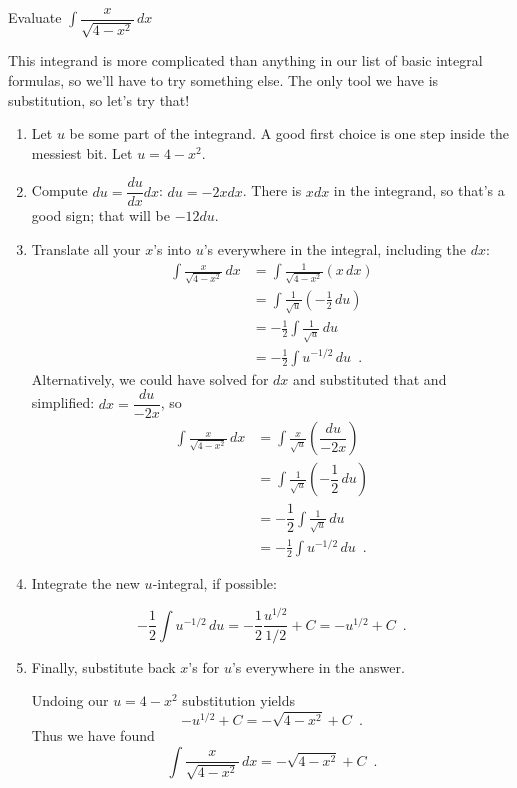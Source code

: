 \begin{example}
Evaluate $\displaystyle\int \dfrac{x}{\sqrt{4-x^2}}\,dx$

\begin{solution}
  This integrand is more complicated than anything in our list of basic integral formulas, so we'll have to try something else. The only tool we have is substitution, so let's try that!
  \begin{enumerate}
    \item Let $u$ be some part of the integrand. A good first choice is one step inside the messiest bit.
    Let $u=4-x^2$.

    \item Compute $du = \dfrac{du}{dx}dx$:
    $du=-2xdx$. There is $xdx$ in the integrand, so that’s a good sign; that will be $-12du$.

    \item Translate all your $x$'s into $u$'s everywhere in the integral, including the $dx$:
    \begin{align*}
    \int \frac{x}{\sqrt{4-x^2}}\,dx &= \int \frac{1}{\sqrt{4-x^2}}(x\,dx)\\
      &= \int \frac{1}{\sqrt{u}}\left(-\frac{1}{2}\,du\right) \\
      &= -\frac{1}{2}\int \frac{1}{\sqrt{u}}\,du\\
      &= -\frac{1}{2}\int u^{-1/2}\,du \enspace .
    \end{align*}
    Alternatively, we could have solved for $dx$ and substituted that and simplified: $dx=\dfrac{du}{-2x}$, so
    \begin{align*}
    \int \frac{x}{\sqrt{4-x^2}}\,dx &= \int \frac{x}{\sqrt{u}}\left(\dfrac{du}{-2x}\right)\\
      &= \int \frac{1}{\sqrt{u}}\left(-\dfrac{1}{2}\,du\right) \\
      &= -\dfrac{1}{2}\int \frac{1}{\sqrt{u}}\,du\\
      &= -\frac{1}{2}\int u^{-1/2}\,du \enspace .
    \end{align*}
  \item Integrate the new $u$-integral, if possible:

  $$-\frac{1}{2}\int u^{-1/2}\,du = -\frac{1}{2}\frac{u^{1/2}}{1/2} + C = -u^{1/2}+C \enspace .$$
  \item Finally, substitute back $x$'s for $u$'s everywhere in the answer.

  Undoing our $u=4-x^2$ substitution yields
  $$-u^{1/2}+C = -\sqrt{4-x^2}+C \enspace .$$
  Thus we have found
  $$\int \frac{x}{\sqrt{4-x^2}}\,dx = -\sqrt{4-x^2}+C \enspace .$$
\end{enumerate}


\end{solution}
\end{example}
